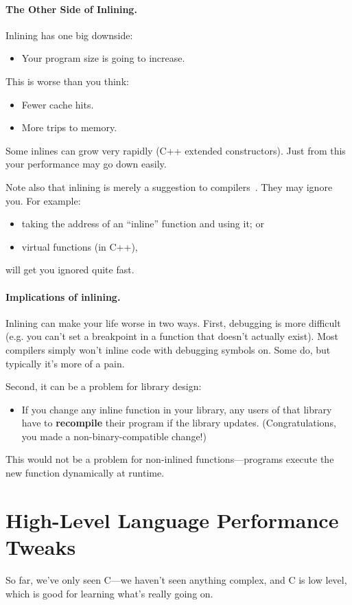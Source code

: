 \paragraph{The Other Side of Inlining.}
Inlining has one big downside:
  \begin{itemize}
    \item Your program size is going to increase.
  \end{itemize}
   This is worse than you think:
      \begin{itemize}
        \item Fewer cache hits.
        \item More trips to memory.
      \end{itemize}
   Some inlines can grow very rapidly (C++ extended constructors).
  Just from this your performance may go down easily.

  Note also that inlining is merely a suggestion to compilers~\cite{gcc:inlining}.
  They may ignore you.
  For example:
  \begin{itemize}
    \item taking the address of an ``inline'' function and using it; or
    \item virtual functions (in C++),
  \end{itemize}
  will get you ignored quite fast.

\paragraph{Implications of inlining.} Inlining can make your life worse in two ways.
First, debugging is more difficult (e.g. you can't set a breakpoint in a function that
  doesn't actually exist).
 Most compilers simply won't inline code with debugging symbols on.
 Some do, but typically it's more of a pain.

Second, it can be a problem for library design:
  \begin{itemize}
    \item If you change any inline function in your library, any users
      of that library have to {\bf recompile} their program if the
      library updates. (Congratulations, you made a non-binary-compatible change!)
  \end{itemize}
This would not be a problem for non-inlined functions---programs execute the new function
dynamically at runtime.

\section*{High-Level Language Performance Tweaks}
So far, we've only seen C---we haven't seen anything complex, and C is
low level, which is good for learning what's really going on.

